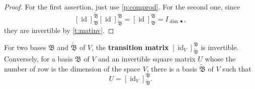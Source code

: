 \begin{proof}
For the first assertion, just use \cref{p:comprod}. For the second one, since $$[\operatorname{id}]_{\mathfrak B}^{\tilde{\mathfrak B}}[\operatorname{id}]^{\mathfrak B}_{\tilde{\mathfrak B}} = [\operatorname{id}]_{\mathfrak B}^{\mathfrak B} = I_{\operatorname{dim}\bullet},$$they are invertible by \cref{t:matinv}.

\end{proof}
\begin{prop}
For two bases $\mathfrak B$ and $\tilde{\mathfrak B}$ of $V$, the \textbf{transition matrix} $[\operatorname{id}_V]^\mathfrak B _{\tilde{ \mathfrak B}}$ is invertible. Conversely, for a basis $\mathfrak B$ of $V$ and an invertible square matrix $U$ whose the number of row is the dimension of the space $V$, there is a basis $\tilde{\mathfrak B}$ of $V$ such that $$U = [\operatorname{id}_V]^\mathfrak B _{\tilde{ \mathfrak B}}.$$
\end{prop}
